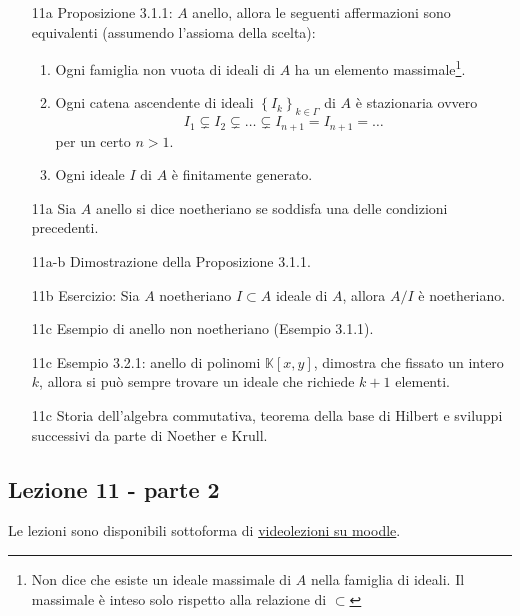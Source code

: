 \documentclass[italian]{article}
\begin{document}
	\begin{enumerate}
      \item[11a] Proposizione 3.1.1\cite{vergura}: $A$ anello, allora le seguenti affermazioni
        sono equivalenti (assumendo l'assioma della scelta):
        \begin{enumerate}
          \item Ogni famiglia non vuota di ideali di $A$ ha un elemento
            massimale\footnote{Non dice che esiste un ideale massimale di $A$
              nella famiglia di ideali. Il massimale è inteso solo rispetto alla
            relazione di $\subset$}.
          \item Ogni catena ascendente di ideali $\left\{ I_k
          \right\}_{k\in \Gamma}$ di $A$  è stazionaria ovvero
            \begin{equation*}
              I_1 \subsetneq I_2 \subsetneq \dots \subsetneq I_{n+1}
              = I_{n+1} = \dots 
            \end{equation*}
            per un certo $n > 1$.
          \item Ogni ideale $I$ di $A$ è finitamente generato.
        \end{enumerate}
      \item[11a] Sia $A$ anello si dice noetheriano se soddisfa una delle
        condizioni precedenti.
      \item[11a-b] Dimostrazione della Proposizione 3.1.1\cite{vergura}.
      \item[11b] Esercizio: Sia $A$ noetheriano $I \subset A$
        ideale di $A$, allora $A/I$ è noetheriano.
      \item[11c] Esempio di anello non noetheriano (Esempio 3.1.1)\cite{vergura}.
      \item[11c] Esempio 3.2.1\cite{vergura}: anello di polinomi $\mathbb{K}\left[ x,y \right]$,
        dimostra che fissato un intero $k$, allora si può sempre trovare un
        ideale che richiede $k+1$ elementi.
      \item[11c] Storia dell'algebra commutativa, teorema della base di Hilbert
        e sviluppi successivi da parte di Noether e Krull.
	\end{enumerate}   

    \subsection{Lezione 11 - parte 2}

	Le lezioni sono disponibili sottoforma di 
	\href{https://didatticaonline.unitn.it/dol/course/view.php?id=23268}{videolezioni
		su moodle}.
	
\end{document}

